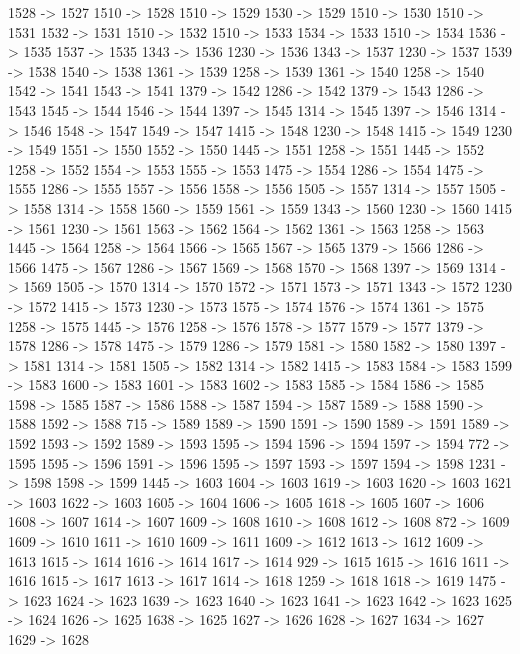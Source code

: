 {	1528 -> 1527
	1510 -> 1528
	1510 -> 1529
	1530 -> 1529
	1510 -> 1530
	1510 -> 1531
	1532 -> 1531
	1510 -> 1532
	1510 -> 1533
	1534 -> 1533
	1510 -> 1534
	1536 -> 1535
	1537 -> 1535
	1343 -> 1536
	1230 -> 1536
	1343 -> 1537
	1230 -> 1537
	1539 -> 1538
	1540 -> 1538
	1361 -> 1539
	1258 -> 1539
	1361 -> 1540
	1258 -> 1540
	1542 -> 1541
	1543 -> 1541
	1379 -> 1542
	1286 -> 1542
	1379 -> 1543
	1286 -> 1543
	1545 -> 1544
	1546 -> 1544
	1397 -> 1545
	1314 -> 1545
	1397 -> 1546
	1314 -> 1546
	1548 -> 1547
	1549 -> 1547
	1415 -> 1548
	1230 -> 1548
	1415 -> 1549
	1230 -> 1549
	1551 -> 1550
	1552 -> 1550
	1445 -> 1551
	1258 -> 1551
	1445 -> 1552
	1258 -> 1552
	1554 -> 1553
	1555 -> 1553
	1475 -> 1554
	1286 -> 1554
	1475 -> 1555
	1286 -> 1555
	1557 -> 1556
	1558 -> 1556
	1505 -> 1557
	1314 -> 1557
	1505 -> 1558
	1314 -> 1558
	1560 -> 1559
	1561 -> 1559
	1343 -> 1560
	1230 -> 1560
	1415 -> 1561
	1230 -> 1561
	1563 -> 1562
	1564 -> 1562
	1361 -> 1563
	1258 -> 1563
	1445 -> 1564
	1258 -> 1564
	1566 -> 1565
	1567 -> 1565
	1379 -> 1566
	1286 -> 1566
	1475 -> 1567
	1286 -> 1567
	1569 -> 1568
	1570 -> 1568
	1397 -> 1569
	1314 -> 1569
	1505 -> 1570
	1314 -> 1570
	1572 -> 1571
	1573 -> 1571
	1343 -> 1572
	1230 -> 1572
	1415 -> 1573
	1230 -> 1573
	1575 -> 1574
	1576 -> 1574
	1361 -> 1575
	1258 -> 1575
	1445 -> 1576
	1258 -> 1576
	1578 -> 1577
	1579 -> 1577
	1379 -> 1578
	1286 -> 1578
	1475 -> 1579
	1286 -> 1579
	1581 -> 1580
	1582 -> 1580
	1397 -> 1581
	1314 -> 1581
	1505 -> 1582
	1314 -> 1582
	1415 -> 1583
	1584 -> 1583
	1599 -> 1583
	1600 -> 1583
	1601 -> 1583
	1602 -> 1583
	1585 -> 1584
	1586 -> 1585
	1598 -> 1585
	1587 -> 1586
	1588 -> 1587
	1594 -> 1587
	1589 -> 1588
	1590 -> 1588
	1592 -> 1588
	715 -> 1589
	1589 -> 1590
	1591 -> 1590
	1589 -> 1591
	1589 -> 1592
	1593 -> 1592
	1589 -> 1593
	1595 -> 1594
	1596 -> 1594
	1597 -> 1594
	772 -> 1595
	1595 -> 1596
	1591 -> 1596
	1595 -> 1597
	1593 -> 1597
	1594 -> 1598
	1231 -> 1598
	1598 -> 1599
	1445 -> 1603
	1604 -> 1603
	1619 -> 1603
	1620 -> 1603
	1621 -> 1603
	1622 -> 1603
	1605 -> 1604
	1606 -> 1605
	1618 -> 1605
	1607 -> 1606
	1608 -> 1607
	1614 -> 1607
	1609 -> 1608
	1610 -> 1608
	1612 -> 1608
	872 -> 1609
	1609 -> 1610
	1611 -> 1610
	1609 -> 1611
	1609 -> 1612
	1613 -> 1612
	1609 -> 1613
	1615 -> 1614
	1616 -> 1614
	1617 -> 1614
	929 -> 1615
	1615 -> 1616
	1611 -> 1616
	1615 -> 1617
	1613 -> 1617
	1614 -> 1618
	1259 -> 1618
	1618 -> 1619
	1475 -> 1623
	1624 -> 1623
	1639 -> 1623
	1640 -> 1623
	1641 -> 1623
	1642 -> 1623
	1625 -> 1624
	1626 -> 1625
	1638 -> 1625
	1627 -> 1626
	1628 -> 1627
	1634 -> 1627
	1629 -> 1628
}
